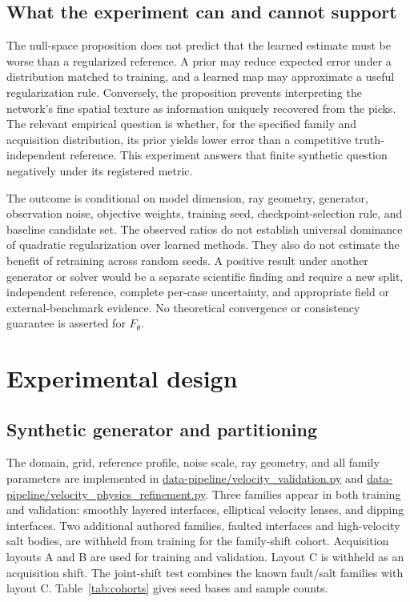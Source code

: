 \documentclass[11pt]{article}
\begin{document}
\subsection{What the experiment can and cannot support}
\label{sec:theory-scope}
The null-space proposition does not predict that the learned estimate must be worse than a regularized reference. A prior may reduce expected error under a distribution matched to training, and a learned map may approximate a useful regularization rule. Conversely, the proposition prevents interpreting the network's fine spatial texture as information uniquely recovered from the picks. The relevant empirical question is whether, for the specified family and acquisition distribution, its prior yields lower error than a competitive truth-independent reference. This experiment answers that finite synthetic question negatively under its registered metric.

The outcome is conditional on model dimension, ray geometry, generator, observation noise, objective weights, training seed, checkpoint-selection rule, and baseline candidate set. The observed ratios do not establish universal dominance of quadratic regularization over learned methods. They also do not estimate the benefit of retraining across random seeds. A positive result under another generator or solver would be a separate scientific finding and require a new split, independent reference, complete per-case uncertainty, and appropriate field or external-benchmark evidence. No theoretical convergence or consistency guarantee is asserted for $F_{\theta}$.

\section{Experimental design}
\label{sec:design}
\subsection{Synthetic generator and partitioning}
\label{sec:generator}
The domain, grid, reference profile, noise scale, ray geometry, and all family parameters are implemented in \url{data-pipeline/velocity_validation.py} and \url{data-pipeline/velocity_physics_refinement.py}. Three families appear in both training and validation: smoothly layered interfaces, elliptical velocity lenses, and dipping interfaces. Two additional authored families, faulted interfaces and high-velocity salt bodies, are withheld from training for the family-shift cohort. Acquisition layouts A and B are used for training and validation. Layout C is withheld as an acquisition shift. The joint-shift test combines the known fault/salt families with layout C. Table~\ref{tab:cohorts} gives seed bases and sample counts.
\end{document}
